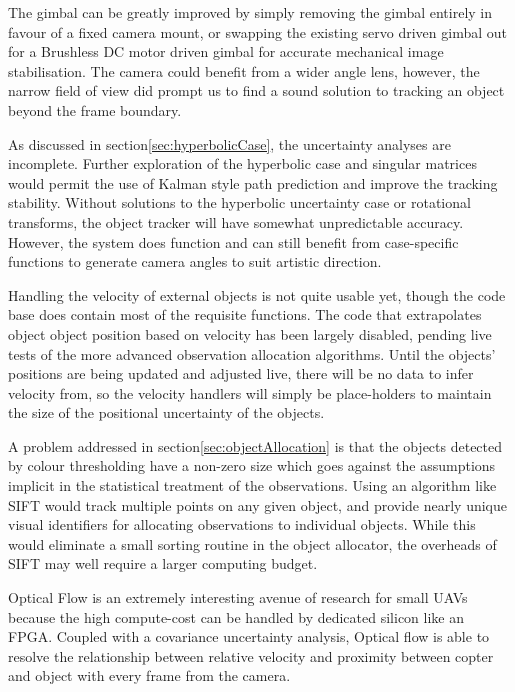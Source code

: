 \documentclass{article}
\begin{document}
  The gimbal can be greatly improved by simply removing the gimbal entirely in favour of a fixed camera mount, or swapping the existing servo driven gimbal out for a Brushless DC motor driven gimbal for accurate mechanical image stabilisation.  The camera could benefit from a wider angle lens, however, the narrow field of view did prompt us to find a sound solution to tracking an object beyond the frame boundary.

  As discussed in section\ref{sec:hyperbolicCase}, the uncertainty analyses are incomplete.  Further exploration of the hyperbolic case and singular matrices would permit the use of Kalman style path prediction and improve the tracking stability.
  Without solutions to the hyperbolic uncertainty case or rotational transforms, the object tracker will have somewhat unpredictable accuracy.  However, the system does function and can still benefit from case-specific functions to generate camera angles to suit artistic direction.

  Handling the velocity of external objects is not quite usable yet, though the code base does contain most of the requisite functions.  The code that extrapolates object object position based on velocity has been largely disabled, pending live tests of the more advanced observation allocation algorithms.  Until the objects' positions are being updated and adjusted live, there will be no data to infer velocity from, so the velocity handlers will simply be place-holders to maintain the size of the positional uncertainty of the objects.

  A problem addressed in section\ref{sec:objectAllocation} is that the objects detected by colour thresholding have a non-zero size which goes against the assumptions implicit in the statistical treatment of the observations.  Using an algorithm like SIFT would track multiple points on any given object, and provide nearly unique visual identifiers for allocating observations to individual objects.  While this would eliminate a small sorting routine in the object allocator, the overheads of SIFT may well require a larger computing budget.

  Optical Flow is an extremely interesting avenue of research for small UAVs because the high compute-cost can be handled by dedicated silicon like an FPGA.  Coupled with a covariance uncertainty analysis, Optical flow is able to resolve the relationship between relative velocity and proximity between copter and object with every frame from the camera.  
\end{document}

